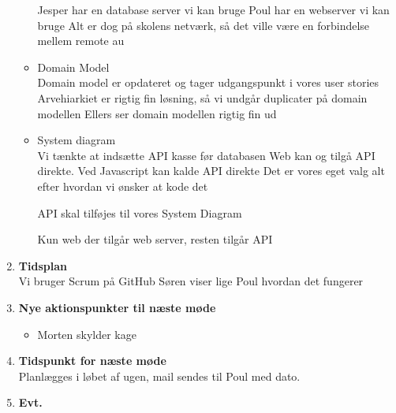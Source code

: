 \begin{enumerate}
\begin{itemize}[-]
				Jesper har en database server vi kan bruge
				Poul har en webserver vi kan bruge
				Alt er dog på skolens netværk, så det ville være en forbindelse mellem remote au
				
				\item Domain Model\\
				Domain model er opdateret og tager udgangspunkt i vores user stories
				Arvehiarkiet er rigtig fin løsning, så vi undgår duplicater på domain modellen
				Ellers ser domain modellen rigtig fin ud
				
				\item System diagram\\
				Vi tænkte at indsætte API kasse før databasen
				Web kan og tilgå API direkte. Ved Javascript kan kalde API direkte
				Det er vores eget valg alt efter hvordan vi ønsker at kode det
				
				API skal tilføjes til vores System Diagram
				
				Kun web der tilgår web server, resten tilgår API		
		\end{itemize}	
		\item \textbf{Tidsplan}\\
			Vi bruger Scrum på GitHub
			Søren viser lige Poul hvordan det fungerer
		\item \textbf{Nye aktionspunkter til næste møde}
		\begin{itemize}[-]
			\itemsep 0.3em 
			\item Morten skylder kage
		\end{itemize}
		\item \textbf{Tidspunkt for næste møde}\\
			Planlægges i løbet af ugen, mail sendes til Poul med dato.
		\item \textbf{Evt.}
	\end{enumerate}
